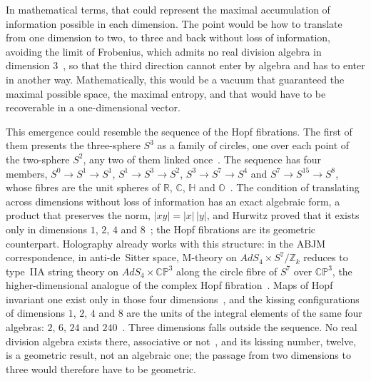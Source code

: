 \documentclass[11pt,reqno]{amsart}
\numberwithin{equation}{section}
\theoremstyle{remark}
\begin{document}
In mathematical terms, that could represent the maximal accumulation of information possible in each
dimension. The point would be how to translate from one dimension to two, to three and back without
loss of information, avoiding the limit of Frobenius, which admits no real division algebra in
dimension $3$~\cite{Fro78}, so that the third direction cannot enter by algebra and has to enter in
another way. Mathematically, this would be a vacuum that guaranteed the maximal possible space, the
maximal entropy, and that would have to be recoverable in a one-dimensional vector.

This emergence could resemble the sequence of the Hopf fibrations. The first of them presents the
three-sphere $S^3$ as a family of circles, one over each point of the two-sphere $S^2$, any two of them
linked once~\cite{Hop31}. The sequence has four members, $S^0\to S^1\to S^1$, $S^1\to S^3\to S^2$,
$S^3\to S^7\to S^4$ and $S^7\to S^{15}\to S^8$, whose fibres are the unit spheres of $\mathbb R$,
$\mathbb C$, $\mathbb H$ and $\mathbb O$~\cite{Hop31,Hop35}. The condition of translating across
dimensions without loss of information has an exact algebraic form, a product that preserves the norm,
$|xy|=|x|\,|y|$, and Hurwitz proved that it exists only in dimensions $1$, $2$, $4$ and
$8$~\cite{Hur98}; the Hopf fibrations are its geometric counterpart. Holography already works with
this structure: in the ABJM correspondence, in anti-de~Sitter space, M-theory on
$AdS_4\times S^7/\mathbb Z_k$ reduces to type~IIA string theory on $AdS_4\times\mathbb{CP}^3$ along the
circle fibre of $S^7$ over $\mathbb{CP}^3$, the higher-dimensional analogue of the complex Hopf
fibration~\cite{ABJM08}. Maps of Hopf invariant one exist only in those four dimensions~\cite{Ada60},
and the kissing configurations of dimensions $1$, $2$, $4$ and $8$ are the units of the integral
elements of the same four algebras: $2$, $6$, $24$ and $240$~\cite{CS03}. Three dimensions falls outside
the sequence. No real division algebra exists there, associative or not~\cite{Fro78,BM58,Ker58}, and
its kissing number, twelve, is a geometric result, not an algebraic one; the passage from two
dimensions to three would therefore have to be geometric.
\end{document}

